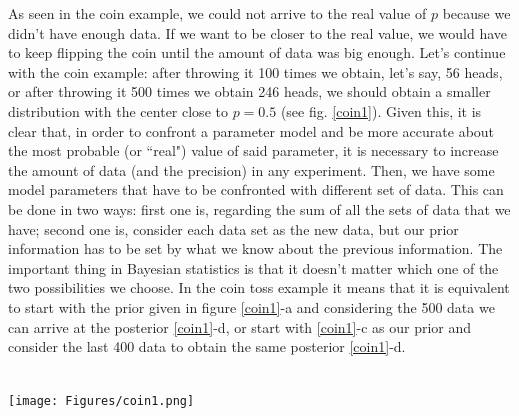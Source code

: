 \documentclass[onecolumn,           %
               showpacs,            %
               preprintnumbers,     %
               aps,                 %
               letterpaper,             %
               superscriptaddress,      %
               nofootinbib,         %
               tightenlines,        %
               floats,floatfix      %
               ,usenatbib,
               ]{revtex4-1}
\begin{document}
As seen in the coin example, we could not arrive to the real value of $p$ because we didn't have enough data. If we want to be closer to the real value, we would have to keep flipping the coin until the amount of data was big enough. Let's continue with the coin example: after throwing it 100 times we obtain, let's say, 56 heads, or after throwing it 500 times we obtain 246 heads, we should obtain a smaller distribution with the center close to $p=0.5$ (see fig. \ref{coin1}). Given this, it is clear that, in order to confront a parameter model and be more accurate about the most probable (or ``real") value of said parameter, it is necessary to increase the amount of data (and the precision) in any experiment. 
Then, we have some model parameters that have to be confronted with different set of data. This can be done in two ways: first one is, regarding the sum of all the sets of data that we have; second one is, consider each data set as the new data, but our prior information has to be set by what we know about the previous information. The important thing in Bayesian statistics is that it doesn't matter which one of the two possibilities we choose. In the coin toss example it means that it is equivalent to start with the prior given in figure \ref{coin1}-a and considering the 500 data we can arrive at the posterior \ref{coin1}-d, or start with \ref{coin1}-c as our prior and consider the last 400 data to obtain the same posterior \ref{coin1}-d. \\ $ $ \\
\begin{minipage}{\textwidth}
\centering
\texttt{[image: Figures/coin1.png]}
\label{coin1}
\end{minipage}
\\$ $ \\
\end{document}
